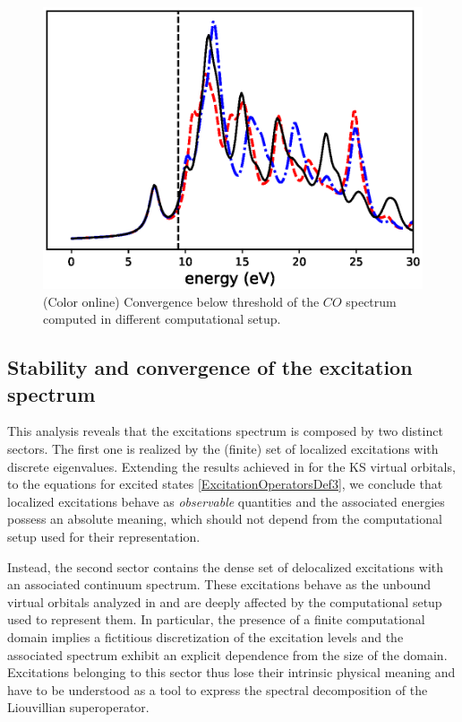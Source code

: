 \documentclass[reprint,aps,prb]{revtex4-1}
\begin{document}
\begin{figure}
\includegraphics[scale=0.56]{co_spectrum.eps}
\caption{\label{co_spectrum}(Color online) Convergence below threshold of the $CO$ spectrum computed in different computational setup.}
\end{figure}

\subsection{Stability and convergence of the excitation spectrum}

This analysis reveals that the excitations spectrum is composed by two distinct sectors. The first one is realized by the (finite) set of localized excitations with discrete eigenvalues. Extending 
the results achieved in \cite{boffi2016} for the KS virtual orbitals, to the equations for excited states \eqref{ExcitationOperatorsDef3}, we conclude that localized excitations behave as 
\emph{observable} quantities and the associated energies possess an absolute meaning, which should not depend from the computational setup used for their representation. 

Instead, the second sector contains the dense set of delocalized excitations with an associated continuum spectrum. These excitations behave as the unbound virtual orbitals analyzed in \cite{boffi2016} 
and are deeply affected by the computational setup used to represent them. In particular, the presence of a finite computational domain implies a fictitious discretization of the excitation levels and 
the associated spectrum exhibit an explicit dependence from the size of the domain. Excitations belonging to this sector thus lose their intrinsic physical meaning and have to be understood as a tool to 
express the spectral decomposition of the Liouvillian superoperator. 
\end{document}
